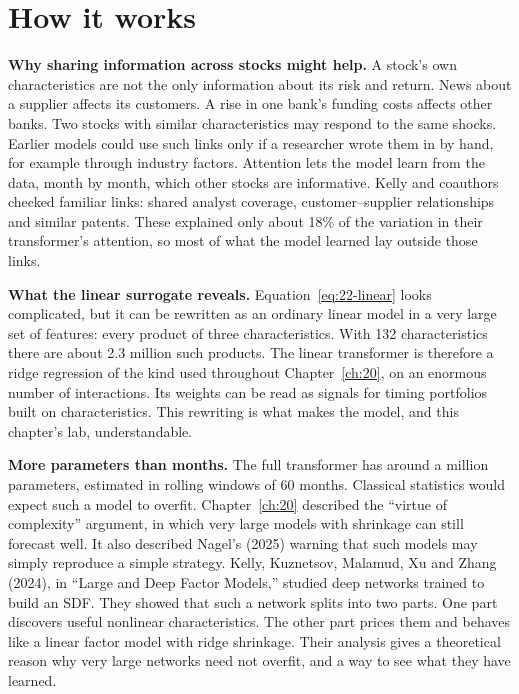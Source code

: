 \section{How it works}
\label{sec:22-how}

\textbf{Why sharing information across stocks might help.} A stock's own characteristics are not the only information about its risk and return. News about a supplier affects its customers. A rise in one bank's funding costs affects other banks. Two stocks with similar characteristics may respond to the same shocks. Earlier models could use such links only if a researcher wrote them in by hand, for example through industry factors. Attention lets the model learn from the data, month by month, which other stocks are informative. Kelly and coauthors checked familiar links: shared analyst coverage, customer--supplier relationships and similar patents. These explained only about 18\% of the variation in their transformer's attention, so most of what the model learned lay outside those links.

\textbf{What the linear surrogate reveals.} Equation~\eqref{eq:22-linear} looks complicated, but it can be rewritten as an ordinary linear model in a very large set of features: every product of three characteristics. With 132 characteristics there are about 2.3 million such products. The linear transformer is therefore a ridge regression of the kind used throughout Chapter~\ref{ch:20}, on an enormous number of interactions. Its weights can be read as signals for timing portfolios built on characteristics. This rewriting is what makes the model, and this chapter's lab, understandable.

\textbf{More parameters than months.} The full transformer has around a million parameters, estimated in rolling windows of 60 months. Classical statistics would expect such a model to overfit. Chapter~\ref{ch:20} described the ``virtue of complexity'' argument, in which very large models with shrinkage can still forecast well. It also described Nagel's (2025) warning that such models may simply reproduce a simple strategy. Kelly, Kuznetsov, Malamud, Xu and Zhang (2024), in ``Large and Deep Factor Models,'' studied deep networks trained to build an SDF. They showed that such a network splits into two parts. One part discovers useful nonlinear characteristics. The other part prices them and behaves like a linear factor model with ridge shrinkage. Their analysis gives a theoretical reason why very large networks need not overfit, and a way to see what they have learned.

